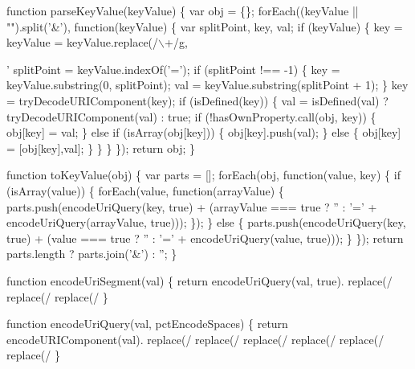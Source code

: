 \begin{DoxyCodeInclude}
\textcolor{keyword}{function} parseKeyValue(keyValue) \{
  var obj = \{\};
  forEach((keyValue || \textcolor{stringliteral}{""}).split(\textcolor{charliteral}{'&'}), \textcolor{keyword}{function}(keyValue) \{
    var splitPoint, key, val;
    \textcolor{keywordflow}{if} (keyValue) \{
      key = keyValue = keyValue.replace(/\(\backslash\)+/g,\textcolor{stringliteral}{'%
      splitPoint = keyValue.indexOf(\textcolor{charliteral}{'='});
      \textcolor{keywordflow}{if} (splitPoint !== -1) \{
        key = keyValue.substring(0, splitPoint);
        val = keyValue.substring(splitPoint + 1);
      \}
      key = tryDecodeURIComponent(key);
      \textcolor{keywordflow}{if} (isDefined(key)) \{
        val = isDefined(val) ? tryDecodeURIComponent(val) : \textcolor{keyword}{true};
        \textcolor{keywordflow}{if} (!hasOwnProperty.call(obj, key)) \{
          obj[key] = val;
        \} \textcolor{keywordflow}{else} \textcolor{keywordflow}{if} (isArray(obj[key])) \{
          obj[key].push(val);
        \} \textcolor{keywordflow}{else} \{
          obj[key] = [obj[key],val];
        \}
      \}
    \}
  \});
  \textcolor{keywordflow}{return} obj;
\}

\textcolor{keyword}{function} toKeyValue(obj) \{
  var parts = [];
  forEach(obj, \textcolor{keyword}{function}(value, key) \{
    \textcolor{keywordflow}{if} (isArray(value)) \{
      forEach(value, \textcolor{keyword}{function}(arrayValue) \{
        parts.push(encodeUriQuery(key, \textcolor{keyword}{true}) +
                   (arrayValue === \textcolor{keyword}{true} ? \textcolor{stringliteral}{''} : \textcolor{charliteral}{'='} + encodeUriQuery(arrayValue, \textcolor{keyword}{true})));
      \});
    \} \textcolor{keywordflow}{else} \{
    parts.push(encodeUriQuery(key, \textcolor{keyword}{true}) +
               (value === \textcolor{keyword}{true} ? \textcolor{stringliteral}{''} : \textcolor{charliteral}{'='} + encodeUriQuery(value, \textcolor{keyword}{true})));
    \}
  \});
  \textcolor{keywordflow}{return} parts.length ? parts.join(\textcolor{charliteral}{'&'}) : \textcolor{stringliteral}{''};
\}


\textcolor{keyword}{function} encodeUriSegment(val) \{
  \textcolor{keywordflow}{return} encodeUriQuery(val, \textcolor{keyword}{true}).
             replace(/%
             replace(/%
             replace(/%
\}


\textcolor{keyword}{function} encodeUriQuery(val, pctEncodeSpaces) \{
  \textcolor{keywordflow}{return} encodeURIComponent(val).
             replace(/%
             replace(/%
             replace(/%
             replace(/%
             replace(/%
             replace(/%
\}

}
\end{DoxyCodeInclude}
